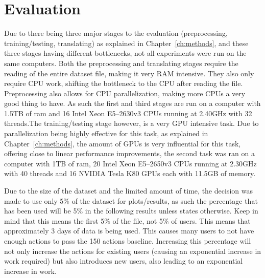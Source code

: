 \chapter{Evaluation}\label{ch:evaluation}

Due to there being three major stages to the evaluation (preprocessing, training/testing, translating) as explained in Chapter~\ref{ch:methods}, and these three stages having different bottlenecks, not all experiments were run on the same computers. Both the preprocessing and translating stages require the reading of the entire dataset file, making it very RAM intensive. They also only require CPU work, shifting the bottleneck to the CPU after reading the file. Preprocessing also allows for CPU parallelization, making more CPUs a very good thing to have. As such the first and third stages are run on a computer with 1.5TB of ram and 16 Intel Xeon E5--2630v3 CPUs running at 2.40GHz with 32 threads.The training/testing stage however, is a very GPU intensive task. Due to parallelization being highly effective for this task, as explained in Chapter~\ref{ch:methods}, the amount of GPUs is very influential for this task, offering close to linear performance improvements, the second task was ran on a computer with 1TB of ram, 20 Intel Xeon E5--2650v3 CPUs running at 2.30GHz with 40 threads and 16 NVIDIA Tesla K80 GPUs each with 11.5GB of memory. 

Due to the size of the dataset and the limited amount of time, the decision was made to use only 5\% of the dataset for plots/results, as such the percentage that has been used will be 5\% in the following results unless states otherwise. Keep in mind that this means the first 5\% of the file, not 5\% of users. This means that approximately 3 days of data is being used. This causes many users to not have enough actions to pass the 150 actions baseline. Increasing this percentage will not only increase the actions for existing users (causing an exponential increase in work required) but also introduces new users, also leading to an exponential increase in work. 


